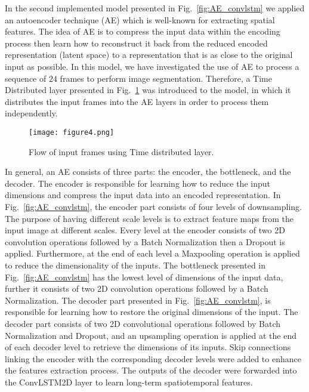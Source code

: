 In the second implemented model presented in Fig.~\ref{fig:AE_convlstm} we applied an autoencoder technique (AE) which is well-known for extracting spatial features.
The idea of AE is to compress the input data within the encoding process then learn how to reconstruct it back from the reduced encoded representation (latent space) to a representation that is as close to the original input as possible. 
In this model, we have investigated the use of AE to process a sequence of \(24\) frames to perform image segmentation.
Therefore, a Time Distributed layer presented in Fig.~\ref{fig:TD} was introduced to the model, in which it distributes the input frames into the AE layers in order to process them independently.
\begin{figure}[!h]
	\centering
	\texttt{[image: figure4.png]}
	\caption{Flow of input frames using Time distributed layer.}
	\label{fig:TD}
\end{figure}

In general, an AE consists of three parts: the encoder, the bottleneck, and the decoder.
The encoder is responsible for learning how to reduce the input dimensions and compress the input data into an encoded representation.
In Fig.~\ref{fig:AE_convlstm}, the encoder part consists of four levels of downsampling. 
The purpose of having different scale levels is to extract feature maps from the input image at different scales.
Every level at the encoder consists of two 2D convolution operations followed by a Batch Normalization then a Dropout is applied. 
Furthermore, at the end of each level a Maxpooling operation is applied to reduce the dimensionality of the inputs. 
The bottleneck presented in Fig.~\ref{fig:AE_convlstm} has the lowest level of dimensions of the input data, further it consists of two 2D convolution operations followed by a Batch Normalization.
The decoder part presented in Fig.~\ref{fig:AE_convlstm}, is responsible for learning how to restore the original dimensions of the input.
The decoder part consists of two 2D convolutional operations followed by Batch Normalization and Dropout, and an upsampling operation is applied at the end of each decoder level to retrieve the dimensions of its inputs.
Skip connections linking the encoder with the corresponding decoder levels were added to enhance the features extraction process.
The outputs of the decoder were forwarded into the ConvLSTM2D layer to learn long-term spatiotemporal features.

